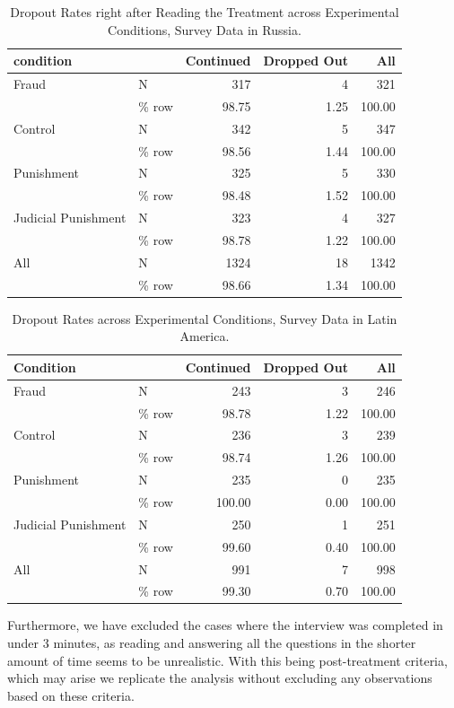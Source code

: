 \documentclass[11pt, ngerman,english,a4]{article}
\begin{document}
\begin{table}
\centering
\caption{Dropout Rates right after Reading the Treatment across Experimental Conditions, Survey Data in Russia.} 
\begin{tabular}[t]{llrrr}
\toprule
condition &   & Continued & Dropped Out & All\\
\midrule
Fraud & N & 317 & 4 & 321\\
 & \% row & 98.75 & 1.25 & 100.00\\
Control & N & 342 & 5 & 347\\
 & \% row & 98.56 & 1.44 & 100.00\\
Punishment & N & 325 & 5 & 330\\
 & \% row & 98.48 & 1.52 & 100.00\\
Judicial Punishment & N & 323 & 4 & 327\\
 & \% row & 98.78 & 1.22 & 100.00\\
All & N & 1324 & 18 & 1342\\
 & \% row & 98.66 & 1.34 & 100.00\\
\bottomrule
\end{tabular}
\end{table}

\begin{table}[!htbp]
\centering
\caption{Dropout Rates across Experimental Conditions, Survey Data in Latin America.} 
\begin{tabular}[t]{llrrr}
\toprule
Condition &   & Continued & Dropped Out & All\\
\midrule
Fraud & N & 243 & 3 & 246\\
 & \% row & 98.78 & 1.22 & 100.00\\
Control & N & 236 & 3 & 239\\
 & \% row & 98.74 & 1.26 & 100.00\\
Punishment & N & 235 & 0 & 235\\
 & \% row & 100.00 & 0.00 & 100.00\\
Judicial Punishment & N & 250 & 1 & 251\\
 & \% row & 99.60 & 0.40 & 100.00\\
All & N & 991 & 7 & 998\\
 & \% row & 99.30 & 0.70 & 100.00\\
\bottomrule
\end{tabular}
\end{table}

\vspace{1cm}

Furthermore, we have excluded the cases where the interview was completed in under 3 minutes, as reading and answering all the questions in the shorter amount of time seems to be unrealistic. With this being post-treatment criteria, which may arise  we replicate the analysis without excluding any observations based on these criteria. 
\end{document}
